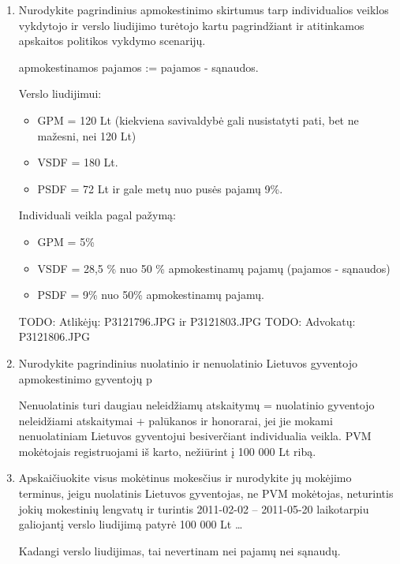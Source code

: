 \begin{enumerate}
  \item Nurodykite pagrindinius apmokestinimo skirtumus tarp
    individualios veiklos vykdytojo ir verslo liudijimo turėtojo
    kartu pagrindžiant ir atitinkamos apskaitos politikos
    vykdymo scenarijų.

    apmokestinamos pajamos := pajamos - sąnaudos.

    Verslo liudijimui:
    \begin{itemize}
      \item GPM = 120 Lt (kiekviena savivaldybė gali nusistatyti pati,
        bet ne mažesni, nei 120 Lt)
      \item VSDF = 180 Lt.
      \item PSDF = 72 Lt ir gale metų nuo pusės pajamų 9\%.
    \end{itemize}

    Individuali veikla pagal pažymą:
    \begin{itemize}
      \item GPM = 5\%
      \item VSDF = 28,5 \% nuo 50 \% apmokestinamų pajamų (pajamos -
        sąnaudos)
      \item PSDF = 9\% nuo 50\% apmokestinamų pajamų.
    \end{itemize}

    TODO: Atlikėjų: P3121796.JPG ir P3121803.JPG
    TODO: Advokatų: P3121806.JPG

  \item Nurodykite pagrindinius nuolatinio ir nenuolatinio Lietuvos
    gyventojo apmokestinimo gyventojų p

    Nenuolatinis turi daugiau neleidžiamų atskaitymų = nuolatinio
    gyventojo neleidžiami atskaitymai + palūkanos ir honorarai,
    jei jie mokami nenuolatiniam Lietuvos gyventojui besiverčiant
    individualia veikla. PVM mokėtojais registruojami iš karto,
    nežiūrint į 100 000 Lt ribą.

  \item Apskaičiuokite visus mokėtinus mokesčius ir nurodykite jų
    mokėjimo terminus, jeigu nuolatinis Lietuvos gyventojas, ne
    PVM mokėtojas, neturintis jokių mokestinių lengvatų ir
    turintis 2011-02-02 – 2011-05-20 laikotarpiu galiojantį verslo
    liudijimą patyrė 100 000 Lt …

    Kadangi verslo liudijimas, tai nevertinam nei pajamų nei
    sąnaudų.
    

\end{enumerate}
